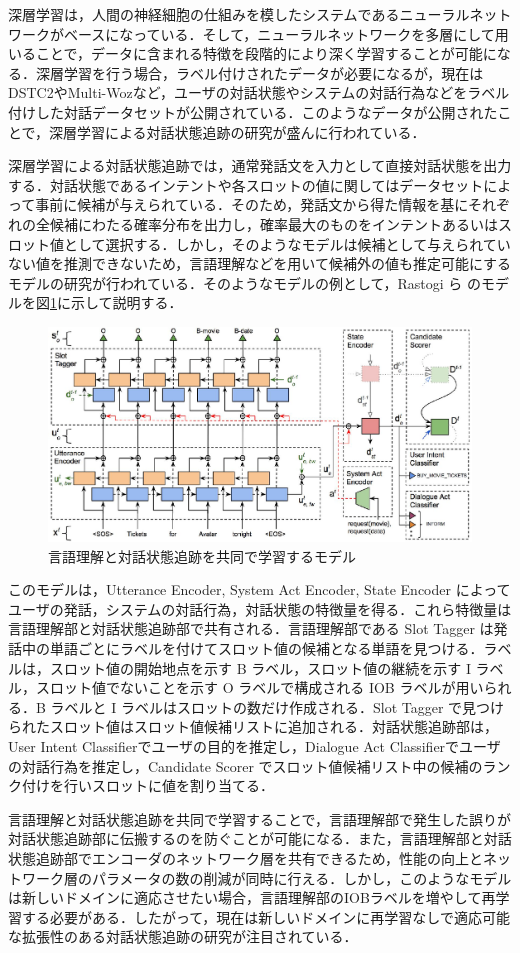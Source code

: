 深層学習は，人間の神経細胞の仕組みを模したシステムであるニューラルネットワークがベースになっている\cite{deeplearning}．そして，ニューラルネットワークを多層にして用いることで，データに含まれる特徴を段階的により深く学習することが可能になる．深層学習を行う場合，ラベル付けされたデータが必要になるが，現在はDSTC2\cite{dstc2}やMulti-Woz\cite{multi-woz}など，ユーザの対話状態やシステムの対話行為などをラベル付けした対話データセットが公開されている．このようなデータが公開されたことで，深層学習による対話状態追跡の研究が盛んに行われている．
\par
深層学習による対話状態追跡では，通常発話文を入力として直接対話状態を出力する\cite{nbt,e2e}．対話状態であるインテントや各スロットの値に関してはデータセットによって事前に候補が与えられている．そのため，発話文から得た情報を基にそれぞれの全候補にわたる確率分布を出力し，確率最大のものをインテントあるいはスロット値として選択する．しかし，そのようなモデルは候補として与えられていない値を推測できないため，言語理解などを用いて候補外の値も推定可能にするモデル\cite{joint,trade,mrc}の研究が行われている．そのようなモデルの例として，Rastogi ら\cite{joint} のモデルを図\ref{fig:joint}に示して説明する．
\begin{figure}[t]
  \begin{center}
    \includegraphics[width=15cm]{chapter2/joint.eps}
    \caption{言語理解と対話状態追跡を共同で学習するモデル\cite{joint}}
    \label{fig:joint}
  \end{center}
\end{figure}
このモデルは，Utterance Encoder, System Act Encoder, State Encoder によってユーザの発話，システムの対話行為，対話状態の特徴量を得る．これら特徴量は言語理解部と対話状態追跡部で共有される．言語理解部である Slot Tagger は発話中の単語ごとにラベルを付けてスロット値の候補となる単語を見つける．ラベルは，スロット値の開始地点を示す B ラベル，スロット値の継続を示す I ラベル，スロット値でないことを示す O ラベルで構成される IOB ラベルが用いられる．B ラベルと I ラベルはスロットの数だけ作成される．Slot Tagger で見つけられたスロット値はスロット値候補リストに追加される．対話状態追跡部は，User Intent Classifierでユーザの目的を推定し，Dialogue Act Classifierでユーザの対話行為を推定し，Candidate Scorer でスロット値候補リスト中の候補のランク付けを行いスロットに値を割り当てる．
\par
言語理解と対話状態追跡を共同で学習することで，言語理解部で発生した誤りが対話状態追跡部に伝搬するのを防ぐことが可能になる．また，言語理解部と対話状態追跡部でエンコーダのネットワーク層を共有できるため，性能の向上とネットワーク層のパラメータの数の削減が同時に行える\cite{joint}．しかし，このようなモデルは新しいドメインに適応させたい場合，言語理解部のIOBラベルを増やして再学習する必要がある．したがって，現在は新しいドメインに再学習なしで適応可能な拡張性のある対話状態追跡の研究が注目されている．